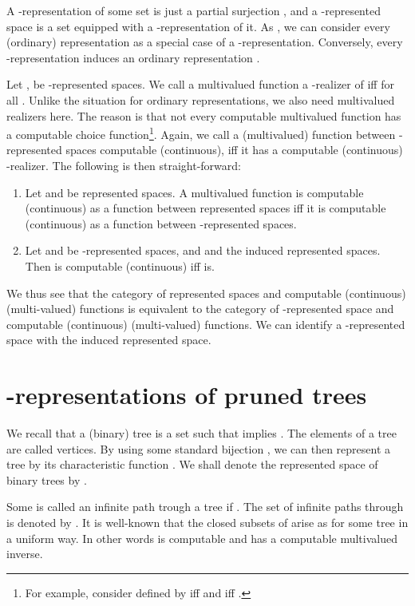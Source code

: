 \documentclass{eptcs-modified}
\begin{document}
A -representation  of some set  is just a partial surjection , and a -represented space is a set equipped with a -representation of it. As , we can consider every (ordinary) representation as a special case of a -representation. Conversely, every -representation  induces an ordinary representation .

Let ,  be -represented spaces. We call a multivalued function  a -realizer of  iff  for all . Unlike the situation for ordinary representations, we also need multivalued realizers here. The reason is that not every computable multivalued function  has a computable choice function\footnote{For example, consider  defined by  iff  and  iff .}. Again, we call a (multivalued) function between -represented spaces computable (continuous), iff it has a computable (continuous) -realizer. The following is then straight-forward:

\begin{proposition}
\begin{enumerate}
\item Let  and  be represented spaces. A multivalued function  is computable (continuous) as a function between represented spaces iff it is computable (continuous) as a function between -represented spaces.
\item Let  and  be -represented spaces, and  and  the induced represented spaces. Then  is computable (continuous) iff  is.
\end{enumerate}
\end{proposition}

 We thus see that the category of represented spaces and  computable (continuous) (multi-valued) functions is equivalent to the category of -represented space and computable (continuous) (multi-valued) functions. We can identify a -represented space with  the induced represented space.




\section{-representations of pruned trees}
\label{sec:cantor}
We recall that a (binary) tree is a set  such that  implies . The elements of a tree are called vertices. By using some standard bijection , we can then represent a tree  by its characteristic function . We shall denote the represented space of binary trees by .

Some  is called an infinite path trough a tree  if . The set of infinite paths through  is denoted by . It is well-known that the closed subsets of  arise as  for some tree in a uniform way. In other words  is computable and has a computable multivalued inverse.
\end{document}
